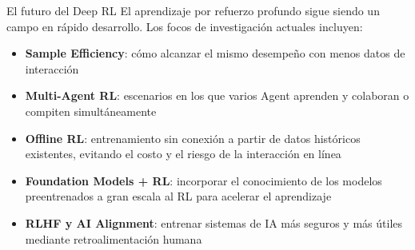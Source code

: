 \documentclass[a4paper]{article}
\begin{document}
\begin{knowledgebox}{El futuro del Deep RL}
El aprendizaje por refuerzo profundo sigue siendo un campo en rápido desarrollo. Los focos de investigación actuales incluyen:
\begin{itemize}
    \item \textbf{Sample Efficiency}: cómo alcanzar el mismo desempeño con menos datos de interacción
    \item \textbf{Multi-Agent RL}: escenarios en los que varios Agent aprenden y colaboran o compiten simultáneamente
    \item \textbf{Offline RL}: entrenamiento sin conexión a partir de datos históricos existentes, evitando el costo y el riesgo de la interacción en línea
    \item \textbf{Foundation Models + RL}: incorporar el conocimiento de los modelos preentrenados a gran escala al RL para acelerar el aprendizaje
    \item \textbf{RLHF y AI Alignment}: entrenar sistemas de IA más seguros y más útiles mediante retroalimentación humana
\end{itemize}
\end{knowledgebox}


\end{document}
